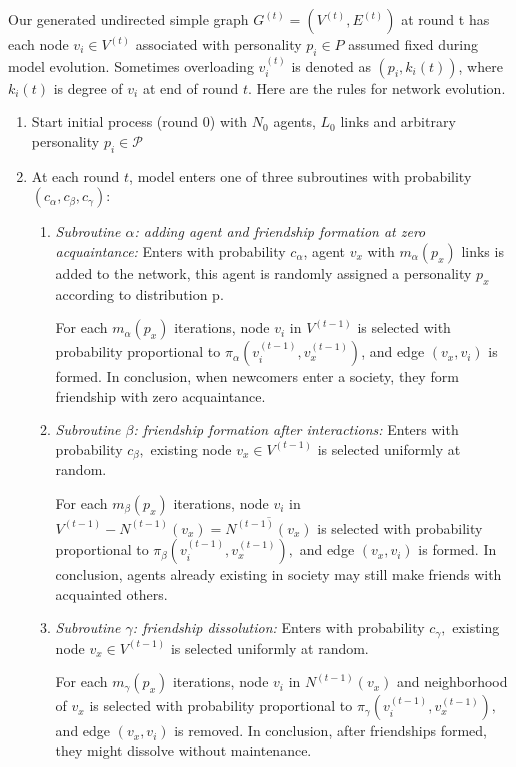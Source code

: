 \documentclass[runningheads]{llncs}
\begin{document}
Our generated undirected simple graph $G^{(t)}=\left(V^{(t)}, E^{(t)}\right)$ at round t has each node $v_{i} \in V^{(t)}$ associated with personality $p_{i} \in P$ assumed fixed during model evolution. Sometimes overloading $v_{i}^{(t)}$ is denoted as $\left(p_{i}, k_{i}(t)\right)$, where $k_{i}(t)$ is degree of $v_{i}$ at end of round $t$. Here are the rules for network evolution.

\begin{enumerate}
    \item 	Start initial process (round 0) with $N_0$ agents, $L_0$ links and arbitrary personality $p_i \in \mathcal{P}$
    \item   At each round $t$, model enters one of three subroutines with probability $\left(c_{\alpha}, c_{\beta}, c_{\gamma}\right)$:
    \begin{enumerate}
        \item 	{\itshape Subroutine $\alpha$: adding agent and friendship formation at zero acquaintance:} 
        Enters with probability $c_\alpha$, agent $v_x$ with $m_\alpha(p_x)$ links is added to the network, this agent is randomly assigned a personality $p_x$ according to distribution p. 
        
        For each $m_\alpha (p_x)$ iterations, node $v_{i}$ in $V^{(t-1)}$ is selected with probability proportional to $\pi_{\alpha}\left(v_{i}^{(t-1)}, v_{x}^{(t-1)}\right)$, and edge $\left(v_{x}, v_{i}\right)$ is formed. In conclusion, when newcomers enter a society, they form friendship with zero acquaintance.
        
        \item  {\itshape Subroutine $\beta$: friendship formation after interactions:} Enters with probability $c_{\beta},$ existing node $v_{x} \in V^{(t-1)}$ is selected uniformly at random. 
        
        For each $m_{\beta}\left(p_{x}\right)$ iterations, node $v_{i}$ in $V^{(t-1)}-N^{(t-1)}\left(v_{x}\right)=\overline{N^{(t-1)}\left(v_{x}\right)}$ is selected with probability proportional to $\pi_{\beta}\left(v_{i}^{(t-1)}, v_{x}^{(t-1)}\right),$ and edge $\left(v_{x}, v_{i}\right)$ is formed. In conclusion, agents already existing in society may still make friends with acquainted others.
        
        \item  {\itshape Subroutine $\gamma$: friendship dissolution:} Enters with probability $c_{\gamma},$ existing node $v_{x} \in V^{(t-1)}$ is selected uniformly at random. 
        
        For each $m_{\gamma}\left(p_{x}\right)$ iterations, node $v_{i}$ in $N^{(t-1)}\left(v_{x}\right)$ and neighborhood of $v_{x}$ is selected with probability proportional to $\pi_{\gamma}\left(v_{i}^{(t-1)}, v_{x}^{(t-1)}\right),$ and edge $\left(v_{x}, v_{i}\right)$ is removed. In conclusion, after friendships formed, they might dissolve without maintenance.

    \end{enumerate}
\end{enumerate}
\end{document}
